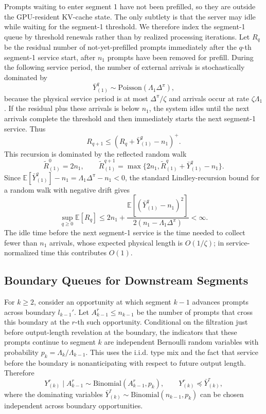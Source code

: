 Prompts waiting to enter segment 1 have not been prefilled, so they are outside the GPU-resident KV-cache state. The only subtlety is that the server may idle while waiting for the segment-1 threshold. We therefore index the segment-1 queue by threshold renewals rather than by realized processing iterations. Let \(R_q\) be the residual number of not-yet-prefilled prompts immediately after the \(q\)-th segment-1 service start, after \(n_1\) prompts have been removed for prefill. During the following service period, the number of external arrivals is stochastically dominated by
\[
    \bar Y^q_{(1)}\sim \mathrm{Poisson}(\Lambda_1\Delta^\pi),
\]
because the physical service period is at most \(\Delta^\pi/\zeta\) and arrivals occur at rate \(\zeta\Lambda_1\). If the residual plus these arrivals is below \(n_1\), the system idles until the next arrivals complete the threshold and then immediately starts the next segment-1 service. Thus
\[
    R_{q+1}\le (R_q+\bar Y^q_{(1)}-n_1)^+ .
\]
This recursion is dominated by the reflected random walk
\[
    \widetilde R^0_{(1)}=2n_1,\qquad
    \widetilde R^{q+1}_{(1)}
    =
    \max\{2n_1,\widetilde R^q_{(1)}+\bar Y^q_{(1)}-n_1\}.
\]
Since \(\mathbb{E}[\bar Y^q_{(1)}]-n_1=\Lambda_1\Delta^\pi-n_1<0\), the standard Lindley-recursion bound for a random walk with negative drift \citep[see, e.g.,][]{kingman1962queues,asmussen2003applied} gives
\[
    \sup_{q\ge0}\mathbb{E}[R_q]
    \le
    2n_1+
    \frac{\mathbb{E}[(\bar Y^q_{(1)}-n_1)^2]}{2(n_1-\Lambda_1\Delta^\pi)}
    <\infty .
\]
The idle time before the next segment-1 service is the time needed to collect fewer than \(n_1\) arrivals, whose expected physical length is \(O(1/\zeta)\); in service-normalized time this contributes \(O(1)\).

\subsection{Boundary Queues for Downstream Segments}

For \(k\ge2\), consider an opportunity at which segment \(k-1\) advances prompts across boundary \(l_{k-1}'\). Let \(A^r_{k-1}\le n_{k-1}\) be the number of prompts that cross this boundary at the \(r\)-th such opportunity. Conditional on the filtration just before output-length revelation at the boundary, the indicators that these prompts continue to segment \(k\) are independent Bernoulli random variables with probability \(p_k=\Lambda_k/\Lambda_{k-1}\). This uses the i.i.d. type mix and the fact that service before the boundary is nonanticipating with respect to future output length. Therefore
\[
    Y^r_{(k)}\mid A^r_{k-1}\sim \mathrm{Binomial}(A^r_{k-1},p_k),
    \qquad
    Y^r_{(k)}\preceq \bar Y^r_{(k)},
\]
where the dominating variables \(\bar Y^r_{(k)}\sim\mathrm{Binomial}(n_{k-1},p_k)\) can be chosen independent across boundary opportunities.


